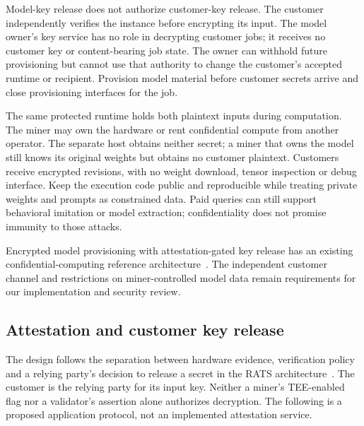 Model-key release does not authorize customer-key release. The customer
independently verifies the instance before encrypting its input. The
model owner's key service has no role in decrypting customer jobs; it
receives no customer key or content-bearing job state. The owner can
withhold future provisioning but cannot use that authority to change the
customer's accepted runtime or recipient. Provision model material before
customer secrets arrive and close provisioning interfaces for the job.

The same protected runtime holds both plaintext inputs during computation.
The miner may own the hardware or rent confidential compute from another
operator. The separate host obtains neither secret; a miner that owns the
model still knows its original weights but obtains no customer plaintext.
Customers receive encrypted revisions, with no weight download, tensor
inspection or debug interface. Keep the execution code public and
reproducible while treating private weights and prompts as constrained
data. Paid queries can still support behavioral imitation or model
extraction; confidentiality does not promise immunity to those attacks.

Encrypted model provisioning with attestation-gated key release has an
existing confidential-computing reference architecture~\cite{nvidiacoco}.
The independent customer channel and restrictions on miner-controlled
model data remain requirements for our implementation and security review.

\subsection{Attestation and customer key release}\label{attested-customer-inference}

The design follows the separation between hardware evidence, verification
policy and a relying party's decision to release a secret in the RATS
architecture~\cite{rats}. The customer is the relying party for its
input key. Neither a miner's TEE-enabled flag nor a validator's
assertion alone authorizes decryption. The following is a proposed
application protocol, not an implemented attestation service.

